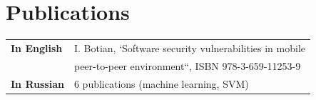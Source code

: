 \documentclass[a4paper,12pt]{article}
\begin{document}

\section*{Publications}

\begin{tabular}{ll}
    \textbf{In English} & I. Botian, `Software security vulnerabilities in mobile \\
        & peer-to-peer environment``, ISBN 978-3-659-11253-9 \\
    \textbf{In Russian} & 6 publications (machine learning, SVM) \\
\end{tabular}
\end{document}
